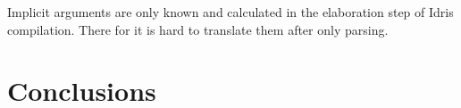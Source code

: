 \documentclass[parskip=half]{scrartcl}
\begin{document}
Implicit arguments are only known and calculated in the elaboration step of
Idris compilation. There for it is hard to translate them after only parsing.




\section{Conclusions}




% 

\printbibliography{}
\end{document}

